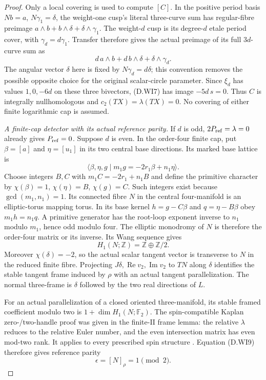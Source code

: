 \begin{proof}
Only a local covering is used to compute $[C]$.
In the positive period basis
$N b=a$, $N\gamma_1=\delta$, the weight-one cusp's literal
three-curve sum has regular-fibre preimage
$a\wedge b+b\wedge\delta+\delta\wedge\gamma_1$.
The weight-$d$ cusp is its degree-$d$ etale period cover, with
$\gamma_d=d\gamma_1$.  Transfer therefore gives the actual
preimage of its full $3d$-curve sum as
\[
 d\,a\wedge b+d\,b\wedge\delta+\delta\wedge\gamma_d.
 \tag{D.WI7}
\]
The angular vector $\delta$ here is fixed by
$N\gamma_d=d\delta$; this convention removes the possible
opposite choice for the original scalar-circle parameter.
Since $\xi_d$ has values $1,0,-6d$ on these three bivectors,
(D.WI7) has image $-5d\,s=0$.  Thus $C$ is integrally
nullhomologous and $c_2(TX)=\lambda(TX)=0$.
No covering of either finite logarithmic cap is assumed.

\emph{A finite-cap detector with its actual reference parity.}
If $d$ is odd, $2P_{\rm ref}=\lambda=0$ already gives
$P_{\rm ref}=0$.  Suppose $d$ is even.  In the order-four
finite cap, put $\beta=[a]$ and $\eta=[u_1]$ in its two
central base directions.  Its marked base lattice is
\[
 \langle\beta,\eta,g\mid m_1g=-2r_1\beta+n_1\eta\rangle .
 \tag{D.WI8}
\]
Choose integers $B,C$ with $m_1C=-2r_1+n_1B$ and define the
primitive character by $\chi(\beta)=1$, $\chi(\eta)=B$,
$\chi(g)=C$.  Such integers exist because $\gcd(m_1,n_1)=1$.
Its connected fibre $N$ in the central four-manifold is an
elliptic-torus mapping torus.  In its base kernel
$h=g-C\beta$ and $q=\eta-B\beta$ obey $m_1h=n_1q$.
A primitive generator has the root-loop exponent inverse to
$n_1$ modulo $m_1$, hence odd modulo four.  The elliptic
monodromy of $N$ is therefore the order-four matrix or its
inverse.  Its Wang sequence gives
\[
             H_1(N;\mathbb Z)=\mathbb Z\oplus\mathbb Z/2.
 \tag{D.WI9}
\]
Moreover $\chi(\delta)=-2$, so the actual scalar tangent
vector is transverse to $N$ in the reduced finite fibre.
Projecting $J\delta,\operatorname{Re}v_2,\operatorname{Im}v_2$
to $TN$ along $\delta$ identifies the stable tangent frame
induced by $\rho$ with an actual tangent parallelization.
The normal three-frame is $\delta$ followed by the two real
directions of $L$.

For an actual parallelization of a closed oriented
three-manifold, its stable framed coefficient modulo two is
$1+\dim H_1(N;\mathbb F_2)$.  The spin-compatible Kaplan
zero-/two-handle proof was given in the finite-II frame lemma:
the relative $\lambda$ reduces to the relative Euler number,
and the even intersection matrix has even mod-two rank.
It applies to every prescribed spin structure
\cite[Definition 1.7 and Theorem 3.1, pp.239,243--246]{mapsKaplan79}.
Equation (D.WI9) therefore gives reference parity
\[
                         \epsilon=[N]_\rho=1\pmod2 .
 \tag{D.WI10}
\]


\end{proof}
